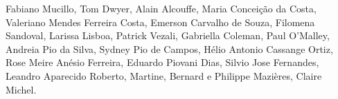 Fabiano Mucillo, Tom Dwyer, Alain Alcouffe, Maria Conceição da Costa, Valeriano Mendes Ferreira Costa, Emerson Carvalho de Souza, Filomena Sandoval, Larissa Lisboa, Patrick Vezali, Gabriella Coleman, Paul O'Malley, Andreia Pio da Silva, Sydney Pio de Campos, Hélio Antonio Cassange Ortiz, Rose Meire Anésio Ferreira, Eduardo Piovani Dias, Silvio Jose Fernandes, Leandro Aparecido Roberto, Martine, Bernard e Philippe Mazières, Claire Michel.
